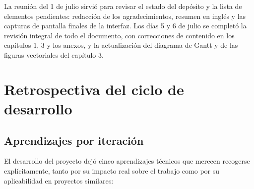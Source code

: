 La reunión del 1 de julio sirvió para revisar el estado del depósito y la lista de elementos pendientes: redacción de los agradecimientos, resumen en inglés y las capturas de pantalla finales de la interfaz. Los días 5 y 6 de julio se completó la revisión integral de todo el documento, con correcciones de contenido en los capítulos 1, 3 y los anexos, y la actualización del diagrama de Gantt y de las figuras vectoriales del capítulo 3.

\section{Retrospectiva del ciclo de desarrollo}

\subsection{Aprendizajes por iteración}

El desarrollo del proyecto dejó cinco aprendizajes técnicos que merecen recogerse explícitamente, tanto por su impacto real sobre el trabajo como por su aplicabilidad en proyectos similares:

